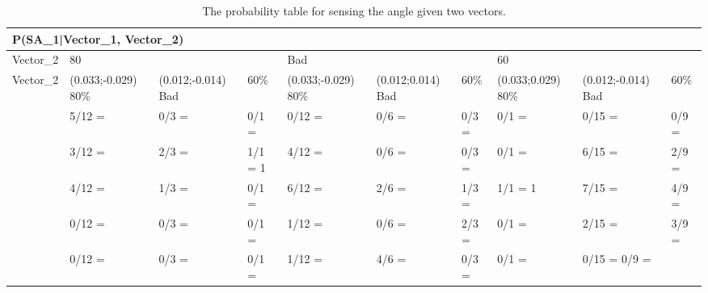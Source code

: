 \begin{table}[H]
\centering
\begin{tabular}{|l|l|l|l|l|l|l|l|l|l|}
\hline
\multicolumn{10}{|l|}{P(SA\_1|Vector\_1, Vector\_2)} \\\hline 
Vector\_2 & \multicolumn{3}{l|}{80} & \multicolumn{3}{l|}{Bad} &
\multicolumn{3}{l|}{60}\\\hline 
Vector\_2 & (0.033;-0.029) 80\% & (0.012;-0.014) Bad & 60\% &(0.033;-0.029) 80\%
& (0.012;0.014) Bad & 60\% & (0.033;0.029) 80\% & (0.012;-0.014) Bad & 60\% \\
\hline
[-30 - 0] & 5/12 =  & 0/3 = & 0/1 = & 0/12 = & 0/6 = & 0/3 = & 0/1 = & 0/15 = &
0/9 = \\ \hline
[0 - 30] & 3/12 = & 2/3 = & 1/1 = 1 & 4/12 = & 0/6 = & 0/3 = & 0/1 = & 6/15 = &
2/9 = \\ \hline
[30 - 60] & 4/12 = & 1/3 = & 0/1 = & 6/12 = & 2/6 = & 1/3 = & 1/1 = 1 & 7/15 = &
4/9 = \\ \hline
[60 - 90] & 0/12 = & 0/3 = & 0/1 = & 1/12 = & 0/6 = & 2/3 = & 0/1 = & 2/15 = &
3/9 = \\ \hline
[90 - 330] & 0/12 = & 0/3 = & 0/1 = & 1/12 = & 4/6 = & 0/3 = & 0/1 = & 0/15 =
0/9 = \\ \hline
\end{tabular}
\caption{The probability table for sensing the angle given two vectors.}
\label{SDtable2}
\end{table}


